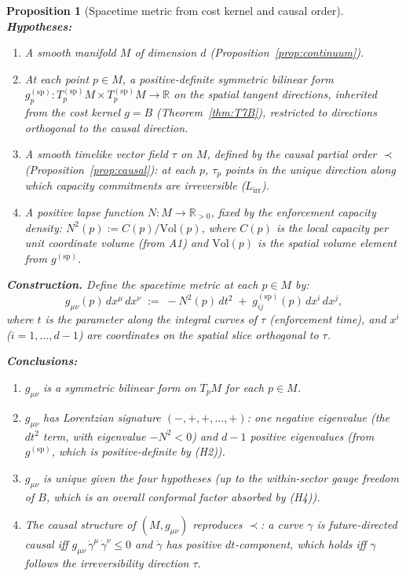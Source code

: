 \documentclass[11pt,a4paper]{article}
\newtheorem{proposition}[theorem]{Proposition}
\theoremstyle{definition}
\begin{document}
\begin{proposition}[Spacetime metric from cost kernel and causal order]%
\label{prop:spacetime_metric}
\textbf{Hypotheses:}
\begin{enumerate}[label=(H\arabic*),nosep]
  \item A smooth manifold $M$ of dimension $d$
  (Proposition~\ref{prop:continuum}).
  \item At each point $p \in M$, a positive-definite symmetric bilinear
  form $g_p^{(\mathrm{sp})}: T_p^{(\mathrm{sp})}M \times
  T_p^{(\mathrm{sp})}M \to \mathbb{R}$ on the spatial tangent
  directions, inherited from the cost kernel $g = B$
  (Theorem~\ref{thm:T7B}), restricted to directions orthogonal to
  the causal direction.
  \item A smooth timelike vector field $\tau$ on $M$, defined by the
  causal partial order $\prec$
  (Proposition~\ref{prop:causal}): at each $p$, $\tau_p$ points in
  the unique direction along which capacity commitments are
  irreversible ($L_{\mathrm{irr}}$).
  \item A positive lapse function $N: M \to \mathbb{R}_{>0}$, fixed by
  the enforcement capacity density: $N^2(p) := C(p) / \mathrm{Vol}(p)$,
  where $C(p)$ is the local capacity per unit coordinate volume (from
  A1) and $\mathrm{Vol}(p)$ is the spatial volume element from
  $g^{(\mathrm{sp})}$.
\end{enumerate}

\noindent\textbf{Construction.}\quad
Define the spacetime metric at each $p \in M$ by:
\begin{equation}\label{eq:lorentz_metric}
  g_{\mu\nu}(p)\,dx^\mu\,dx^\nu \;:=\;
  -N^2(p)\,dt^2 \;+\; g_{ij}^{(\mathrm{sp})}(p)\,dx^i\,dx^j,
\end{equation}
where $t$ is the parameter along the integral curves of $\tau$
(enforcement time), and $x^i$ ($i = 1, \ldots, d{-}1$) are coordinates
on the spatial slice orthogonal to $\tau$.

\noindent\textbf{Conclusions:}
\begin{enumerate}[label=(\roman*),nosep]
  \item $g_{\mu\nu}$ is a symmetric bilinear form on $T_pM$ for each
  $p \in M$.
  \item $g_{\mu\nu}$ has Lorentzian signature $(-,+,+,\ldots,+)$:
  one negative eigenvalue (the $dt^2$ term, with eigenvalue $-N^2 < 0$)
  and $d-1$ positive eigenvalues (from $g^{(\mathrm{sp})}$, which is
  positive-definite by (H2)).
  \item $g_{\mu\nu}$ is unique given the four hypotheses
  (up to the within-sector gauge freedom of $B$, which is an overall
  conformal factor absorbed by (H4)).
  \item The causal structure of $(M, g_{\mu\nu})$ reproduces $\prec$:
  a curve $\gamma$ is future-directed causal iff
  $g_{\mu\nu}\,\dot{\gamma}^\mu\,\dot{\gamma}^\nu \le 0$ and
  $\dot{\gamma}$ has positive $dt$-component, which holds iff
  $\gamma$ follows the irreversibility direction $\tau$.
\end{enumerate}
\end{proposition}
\end{document}

